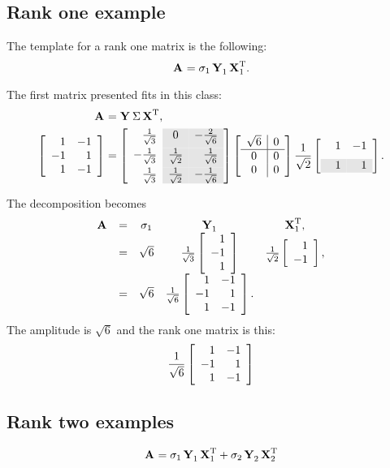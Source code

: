 \subsection{Rank one example}
The template for a rank one matrix is the following:
\begin{equation}
 \A{} = \sigma_{1}\, \Y{}_{1}\, \X{T}_{1}.
\end{equation}

The first matrix presented fits in this class:
\begin{equation}
  \begin{split}
    \svda{T},\\
    \archetypez.
  \end{split}
\end{equation}

The decomposition becomes
\begin{equation}
  \begin{array}{rcccc}
    \A{} &=& \sigma_{1} & \Y{}_{1} & \X{T}_{1},\\
         &=& \sqrt{6}  & \sthree \mat{r}{1\\-1\\1} & \stwo \mat{rr}{1\\-1},\\
         &=& \sqrt{6}  & \ssix \Aexample.
  \end{array}
\end{equation}
The amplitude is $\sqrt{6}$ and the rank one matrix is this:
\begin{equation}
  \ssix \Aexample
\end{equation}



\subsection{Rank two examples}
\begin{equation}
 \A{} = \sigma_{1}\, \Y{}_{1}\, \X{T}_{1} + \sigma_{2}\, \Y{}_{2}\, \X{T}_{2}
\end{equation}

